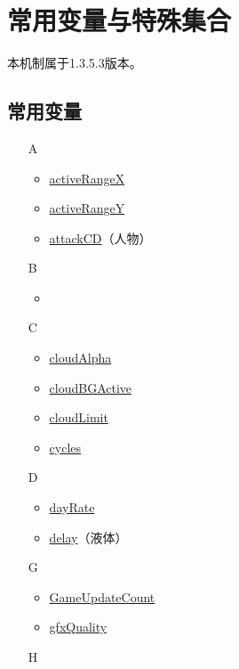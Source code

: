 \chapter{常用变量与特殊集合}
\begin{note}
本机制属于1.3.5.3版本。
\end{note}
\section{常用变量}
\begin{multicols}{2}[]
{\ttfamily
\begin{itemize}
\item[A] \begin{itemize}
	\item \hyperref[tab9]{activeRangeX}
	\item \hyperref[tab9]{activeRangeY}
	\item \hyperref[sec28]{attackCD}（人物）
	\end{itemize}
\item[B] \begin{itemize}
	\item \hyperref[sec9]{}
	\end{itemize}
\item[C] \begin{itemize}
	\item \href{https://www.bbstr.net/threads/133/#post-623}{cloudAlpha}
	\item \href{https://www.bbstr.net/threads/133/#post-623}{cloudBGActive}
	\item \href{https://www.bbstr.net/threads/133/#post-623}{cloudLimit}
	\item \hyperref[tab10]{cycles}
	\end{itemize}
\item[D] \begin{itemize}
	\item \href{https://www.bbstr.net/threads/133/#post-623}{dayRate}
	\item \hyperref[tab10]{delay}（液体）
	\end{itemize}
\item[G] \begin{itemize}
	\item \hyperref[sec27]{GameUpdateCount}
	\item \hyperref[app34]{gfxQuality}
	\end{itemize}
\item[H] \begin{itemize}

\end{itemize}
\end{itemize}}
\end{multicols}
